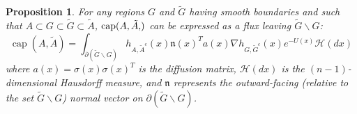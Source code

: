 \documentclass[nofootinbib,english, aip, jcp, priprint, graphicx,floatfix]{revtex4-1}
\newtheorem{proposition}{Proposition}
\theoremstyle{plain}
\theoremstyle{definition}
\theoremstyle{plain}
\newcommand{\normal}{{\mathfrak{n}}}
\newcommand{\capac}[2]{\ensuremath{\operatorname{cap}}(#1,#2)}
\newcommand{\hausdorffmeasure}{\mathscr{H}(dx)}
\newcommand{\tA}{{\tilde A}}
\begin{document}
\begingroup
\def\theproposition{\ref{prop:flux}}
\begin{proposition}
For any regions $G$ and $\tilde{G}$ having smooth boundaries and such that $A\subset G \subset \tilde G \subset \tilde A$, $\capac{A,\tA}$ can be expressed as a flux leaving $\tilde G \backslash G$:
\[
\ensuremath{\operatorname{cap}} (A, \tilde{A}) = \int_{\partial (\tilde G \backslash G)}  h_{A, \tilde{A}^c} (x)   \normal(x)^T a (x) \nabla h_{G, \tilde{G}^c} (x)e^{- U (x)} \hausdorffmeasure
\]
where $a(x)=\sigma(x)\sigma(x)^T$ is the diffusion matrix, $\hausdorffmeasure$ is the $(n-1)$-dimensional Hausdorff measure, and $\normal$ represents the outward-facing (relative to the set $\tilde G \backslash G$) normal vector on $\partial (\tilde G \backslash G)$.
\end{proposition}
\addtocounter{proposition}{-1}
\endgroup
\end{document}
